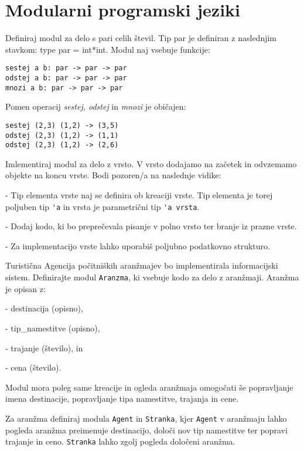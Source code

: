 \chapter{Modularni programski jeziki}





\begin{ex}
Definiraj modul za delo s pari celih \v stevil. Tip par je definiran z
naslednjim stavkom: type par = int*int. Modul naj vsebuje funkcije:

\begin{lstlisting}
sestej a b: par -> par -> par
odstej a b: par -> par -> par
mnozi a b: par -> par -> par
\end{lstlisting}
Pomen operacij \emph{sestej, odstej} in \emph{mnozi} je obi\v cajen:
\begin{lstlisting}
sestej (2,3) (1,2) -> (3,5)
odstej (2,3) (1,2) -> (1,1)
odstej (2,3) (1,2) -> (2,6)
\end{lstlisting}
\end{ex}



\begin{ex}
Imlementiraj modul za delo z vrsto. V vrsto dodajamo na za\v cetek in
odvzemamo objekte na koncu vrste. Bodi pozoren/a na naslednje vidike:

- Tip elementa vrste naj se definira ob kreaciji vrste. Tip elementa
  je torej poljuben tip \lstinline{'a} in vrsta je parametri\v cni tip \lstinline{'a vrsta}.
  
- Dodaj kodo, ki bo prepre\v cevala pisanje v polno vrsto ter branje iz
  prazne vrste.
  
- Za implementacijo vrste lahko uporabi\v s poljubno podatkovno strukturo.
\end{ex}



\begin{ex}
Turisti\v cna Agencija po\v citni\v skih aran\v zmajev bo implementirala
informacijski sistem.
Definirajte modul \lstinline{Aranzma}, ki vsebuje kodo za delo z
aran\v zmaji. Aran\v zma je opisan z:

- destinacija (opisno), 

- tip\_namestitve (opisno), 

- trajanje (\v stevilo), in 

- cena (\v stevilo).

Modul mora poleg same kreacije in ogleda aran\v zmaja omogo\v cati \v se
popravljanje imena destinacije, popravljanje tipa namestitve, trajanja
in cene.

Za aran\v zma definiraj modula \lstinline{Agent} in \lstinline{Stranka}, kjer \lstinline{Agent} v aran\v zmaju
lahko pogleda aran\v zma preimenuje destinacijo, dolo\v ci nov tip
namestitve ter popravi trajanje in ceno. \lstinline{Stranka} lahko zgolj pogleda
dolo\v ceni aran\v zma.
\end{ex}



